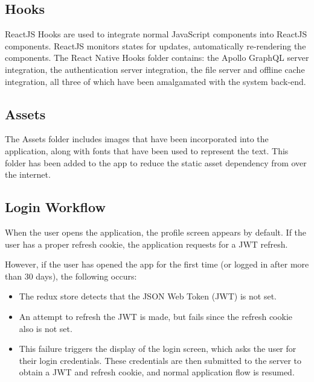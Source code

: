 \subsection{Hooks}
ReactJS Hooks are used to integrate normal JavaScript components into ReactJS components. 
ReactJS monitors states for updates, automatically re-rendering the components.
The React Native Hooks folder contains: the Apollo GraphQL server integration, 
the authentication server integration, the file server and offline cache integration, 
all three of which have been amalgamated with the system back-end.

\subsection{Assets}
The Assets folder includes images that have been incorporated into the application, along with fonts that have been used to represent the text. 
This folder has been added to the app to reduce the static asset dependency from over the internet.

\subsection{Login Workflow}
When the user opens the application, the profile screen appears by default. 
If the user has a proper refresh cookie, the application requests for a JWT refresh. 

However, if the user has opened the app for the first time (or logged in after more 
than 30 days), the following occurs: 
\begin{itemize}
    \item The redux store detects that the JSON Web Token (JWT) is not set.
    \item An attempt to refresh the JWT is made, but fails since the refresh cookie also is not set.
    \item This failure triggers the display of the login screen, which asks the user for their login 
    credentials. These credentials are then submitted to the server to obtain a JWT and refresh cookie, 
    and normal application flow is resumed.
\end{itemize}
